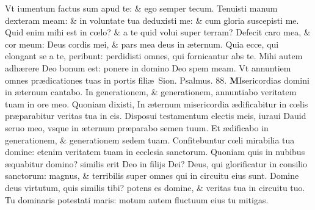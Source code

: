 \documentclass[a5paper,10pt]{book}
\def\ae{æ}
\def\oe{œ}
\begin{document}
\begin{multicols*}{2}
\newline \color{red} V\color{black}t iumentum factus sum apud te: \& ego semper tecum.
\newline \color{red} T\color{black}enuisti manum dexteram meam: \& in voluntate tua deduxisti me: \& cum gloria suscepisti me.
\newline \color{red} Q\color{black}uid enim mihi est in c\oe lo? \& a te quid volui super terram?
\newline \color{red} D\color{black}efecit caro mea, \& cor meum: Deus cordis mei, \& pars mea deus in \ae ternum.
\newline \color{red} Q\color{black}uia ecce, qui elongant se a te, peribunt: perdidisti omnes, qui fornicantur abs te.
\newline \color{red} M\color{black}ihi autem adh\ae rere Deo bonum est: ponere in domino Deo spem meam.
\newline \color{red} V\color{black}t annuntiem omnes pr\ae dicationes tuas in portis fili\ae \ Sion. \color{red} Psalmus. \hypertarget{ps88}{88.} \color{black}
\vspace{-1em}
\lettrine[lines=2]{\bfseries \color{red} M}{}Isericordias domini in \ae ternum cantabo.
\newline \color{red} I\color{black}n generationem, \& generationem, annuntiabo veritatem tuam in ore meo.
\newline \color{red} Q\color{black}uoniam dixisti, In \ae ternum misericordia \ae dificabitur in c\oe lis pr\ae parabitur veritas tua in eis.
\newline \color{red} D\color{black}isposui testamentum electis meis, iuraui Dauid seruo meo, vsque in \ae ternum pr\ae parabo semen tuum.
\newline \color{red} E\color{black}t \ae dificabo in generationem, \& generationem sedem tuam.
\newline \color{red} C\color{black}onfitebuntur c\oe li mirabilia tua domine: etenim veritatem tuam in ecclesia sanctorum.
\newline \color{red} Q\color{black}uoniam quis in nubibus \ae quabitur domino? similis erit Deo in filijs Dei?
\newline \color{red} D\color{black}eus, qui glorificatur in consilio sanctorum: magnus, \& terribilis super omnes qui in circuitu eius sunt.
\newline \color{red} D\color{black}omine deus virtutum, quis similis tibi? potens es domine, \& veritas tua in circuitu tuo.
\newline \color{red} T\color{black}u dominaris potestati maris: motum autem fluctuum eius tu mitigas.

\end{multicols*}
\end{document}
